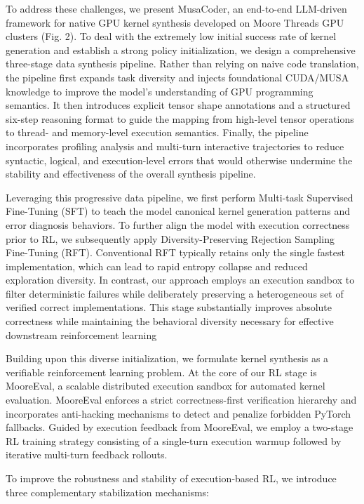 \documentclass[
  10
]{article}
\begin{document}
To address these challenges, we present MusaCoder, an end-to-end
LLM-driven framework for native GPU kernel synthesis developed on Moore
Threads GPU clusters (Fig. 2). To deal with the extremely low initial
success rate of kernel generation and establish a strong policy
initialization, we design a comprehensive three-stage data synthesis
pipeline. Rather than relying on naive code translation, the pipeline
first expands task diversity and injects foundational CUDA/MUSA
knowledge to improve the model's understanding of GPU programming
semantics. It then introduces explicit tensor shape annotations and a
structured six-step reasoning format to guide the mapping from
high-level tensor operations to thread- and memory-level execution
semantics. Finally, the pipeline incorporates profiling analysis and
multi-turn interactive trajectories to reduce syntactic, logical, and
execution-level errors that would otherwise undermine the stability and
effectiveness of the overall synthesis pipeline.

Leveraging this progressive data pipeline, we first perform Multi-task
Supervised Fine-Tuning (SFT) to teach the model canonical kernel
generation patterns and error diagnosis behaviors. To further align the
model with execution correctness prior to RL, we subsequently apply
Diversity-Preserving Rejection Sampling Fine-Tuning (RFT). Conventional
RFT typically retains only the single fastest implementation, which can
lead to rapid entropy collapse and reduced exploration diversity. In
contrast, our approach employs an execution sandbox to filter
deterministic failures while deliberately preserving a heterogeneous set
of verified correct implementations. This stage substantially improves
absolute correctness while maintaining the behavioral diversity
necessary for effective downstream reinforcement learning

Building upon this diverse initialization, we formulate kernel synthesis
as a verifiable reinforcement learning problem. At the core of our RL
stage is MooreEval, a scalable distributed execution sandbox for
automated kernel evaluation. MooreEval enforces a strict
correctness-first verification hierarchy and incorporates anti-hacking
mechanisms to detect and penalize forbidden PyTorch fallbacks. Guided by
execution feedback from MooreEval, we employ a two-stage RL training
strategy consisting of a single-turn execution warmup followed by
iterative multi-turn feedback rollouts.

To improve the robustness and stability of execution-based RL, we
introduce three complementary stabilization mechanisms:
\end{document}
